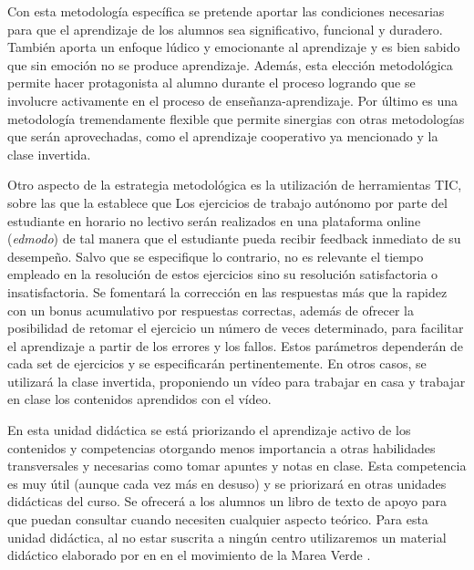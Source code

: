 Con esta metodología específica se pretende aportar las condiciones necesarias para que el aprendizaje de los alumnos sea significativo, funcional y duradero.
%
También aporta un enfoque lúdico y emocionante al aprendizaje y es bien sabido que sin emoción no se produce aprendizaje.
%
Además, esta elección metodológica permite hacer protagonista al alumno durante el proceso logrando que se involucre activamente en el proceso de enseñanza-aprendizaje.
%
Por último es una metodología tremendamente flexible que permite sinergias con otras metodologías que serán aprovechadas, como el aprendizaje cooperativo ya mencionado y la clase invertida.


Otro aspecto de la  estrategia metodológica es la utilización de herramientas \gls{TIC}, sobre las que la \lomce establece que 
%
Los ejercicios de trabajo autónomo por parte del estudiante en horario no lectivo serán realizados en una plataforma online (\textit{edmodo}) de tal manera que el estudiante pueda recibir feedback inmediato de su desempeño.
%
Salvo que se especifique lo contrario, no es relevante el tiempo empleado en la resolución de estos ejercicios sino su resolución satisfactoria o insatisfactoria.
%
Se fomentará la corrección en las respuestas más que la rapidez con un bonus acumulativo por respuestas correctas, además de ofrecer la posibilidad de retomar el ejercicio un número de veces determinado, para facilitar el aprendizaje a partir de los errores y los fallos.
%
Estos parámetros dependerán de cada set de ejercicios y se especificarán pertinentemente.
%
En otros casos, se utilizará la clase invertida, proponiendo un vídeo para trabajar en casa y trabajar en clase los contenidos aprendidos con el vídeo.


En esta unidad didáctica se está priorizando el aprendizaje activo de los contenidos y competencias otorgando menos importancia a otras habilidades transversales y necesarias como tomar apuntes y notas en clase. 
%
Esta competencia es muy útil (aunque cada vez más en desuso) y se priorizará en otras unidades didácticas del curso. 
%
Se ofrecerá a los alumnos un libro de texto de apoyo para que puedan consultar cuando necesiten cualquier aspecto teórico.
%
Para esta unidad didáctica, al no estar suscrita a ningún centro utilizaremos un material didáctico elaborado por \citeauthor{MareaVerde} en \citeyear{MareaVerde} en el movimiento de la Marea Verde \citep{MareaVerde}.


